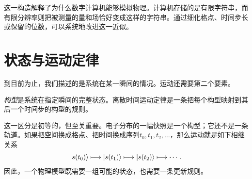 这一构造解释了为什么数字计算机能够模拟物理。计算机存储的是有限字符串，而有限分辨率则把被测量的量和场恰好变成这样的字符串。通过细化格点、时间步长或保留的位数，可以系统地改进这一近似。

\begin{classroomqa}
\end{classroomqa}

\begin{classroomqa}
\end{classroomqa}

\section{状态与运动定律}

到目前为止，我们描述的是系统在某一瞬间的情况。运动还需要第二个要素。

\begin{definition}
\emph{构型}是系统在指定瞬间的完整状态。离散时间运动定律是一条把每个构型映射到其后一个时间步的构型的规则。
\end{definition}

这一区分是初等的，但至关重要。电子分布的一幅快照是一个构型；它还不是一条轨道。如果把空间换成格点、把时间换成序列\(t_0,t_1,t_2,\ldots\)，那么运动就是如下相继关系
\begin{equation}
  \left\lvert s(t_0)\right\rangle
  \longmapsto
  \left\lvert s(t_1)\right\rangle
  \longmapsto
  \left\lvert s(t_2)\right\rangle
  \longmapsto\cdots.
  \label{eq:l01-discrete-motion}
\end{equation}
因此，一个物理模型既需要一组可能的状态，也需要一条更新规则。

\begin{classroomqa}
\end{classroomqa}

